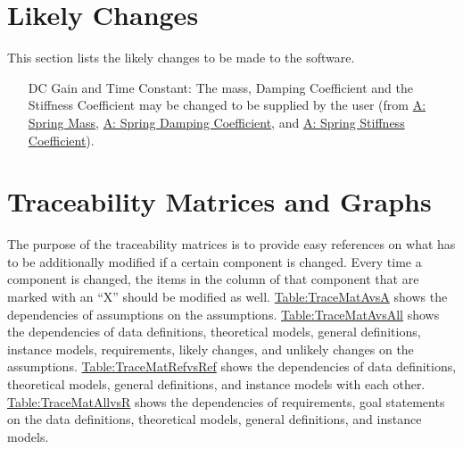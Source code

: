 \documentclass[12pt]{article}
\begin{document}
\section{Likely Changes}
\label{Sec:LCs}
This section lists the likely changes to be made to the software.

\begin{itemize}
\item[DC Gain and Time Constant:\phantomsection\label{likeChgPP}]{The mass, Damping Coefficient and the Stiffness Coefficient may be changed to be supplied by the user (from \hyperref[massSpring]{A: Spring Mass}, \hyperref[dampingCoeffSpring]{A: Spring Damping Coefficient}, and \hyperref[stiffnessCoeffSpring]{A: Spring Stiffness Coefficient}).}
\end{itemize}
\section{Traceability Matrices and Graphs}
\label{Sec:TraceMatrices}
The purpose of the traceability matrices is to provide easy references on what has to be additionally modified if a certain component is changed. Every time a component is changed, the items in the column of that component that are marked with an ``X'' should be modified as well. \hyperref[Table:TraceMatAvsA]{Table:TraceMatAvsA} shows the dependencies of assumptions on the assumptions. \hyperref[Table:TraceMatAvsAll]{Table:TraceMatAvsAll} shows the dependencies of data definitions, theoretical models, general definitions, instance models, requirements, likely changes, and unlikely changes on the assumptions. \hyperref[Table:TraceMatRefvsRef]{Table:TraceMatRefvsRef} shows the dependencies of data definitions, theoretical models, general definitions, and instance models with each other. \hyperref[Table:TraceMatAllvsR]{Table:TraceMatAllvsR} shows the dependencies of requirements, goal statements on the data definitions, theoretical models, general definitions, and instance models.
\end{document}
